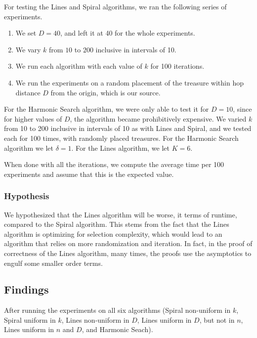 \documentclass[runningheads,a4paper]{llncs}
\begin{document}
For testing the Lines and Spiral algorithms, we ran the following series of experiments. 
\begin{enumerate}
\item We set $D = 40$, and left it at 40 for the whole experiments. 
\item We vary $k$ from $10$ to $200$ inclusive in intervals of 10. 
\item We run each algorithm with each value of $k$ for 100 iterations.
\item We run the experiments on a random placement of the treasure within hop distance $D$ from the origin, which is our source.
\end{enumerate}

For the Harmonic Search algorithm, we were only able to test it for $D = 10$, since for higher values of $D$, the algorithm became prohibitively expensive. We varied $k$ from 10 to 200 inclusive in intervals of 10 as with Lines and Spiral, and we tested each for 100 times, with randomly placed treasures. For the Harmonic Search algorithm we let $\delta = 1$. For the Lines algorithm, we let $K = 6$.  

When done with all the iterations, we compute the average time per 100 experiments and assume that this is the expected value. 

\subsubsection{Hypothesis} We hypothesized that the Lines algorithm will be worse, it terms of runtime, compared to the Spiral algorithm. This stems from the fact that the Lines algorithm is optimizing for selection complexity, which would lead to an algorithm that relies on more randomization and iteration. In fact, in the proof of correctness of the Lines algorithm, many times, the proofs use the asymptotics to engulf some smaller order terms.

\subsection{Findings}

After running the experiments on all six algorithms (Spiral non-uniform in $k$, Spiral uniform in $k$, Lines non-uniform in $D$, Lines uniform in $D$, but not in $n$, Lines uniform in $n$ and $D$, and Harmonic Seach). 
\end{document}
